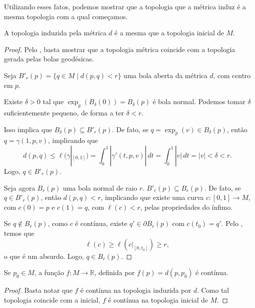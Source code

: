 Utilizando esses fatos, podemos mostrar que a topologia que a métrica induz é a mesma topologia com a qual começamos.
\begin{proposition}
    \label{prop:topologia-metrica-inicial}
    A topologia induzida pela métrica $d$ é a mesma que a topologia inicial de $M$.
    \begin{proof}

        Pelo , basta mostrar que a topologia métrica coincide com a topologia gerada pelas bolas geodésicas.

        Seja $B'_r(p) = \{q \in M \mid d(p,q) < r\}$ uma bola aberta da métrica $d$, com centro em $p$.

        Existe $\delta > 0$ tal que $\exp_p(B_\delta(0)) = B_\delta(p)$ é bola normal. Podemos tomar $\delta$ suficientemente pequeno, de forma a ter $\delta < r$.

        Isso implica que $B_\delta(p) \subseteq B'_r(p)$. De fato, se $q = \exp_p(v) \in B_\delta(p)$, então $q = \gamma(1,p,v)$, implicando que
        \begin{equation*}
            d(p,q) \leq \ell(\gamma|_{[0,1]}) = \int_0^1 |\gamma'(t,p,v)|\,dt = \int_0^1 |v|\,dt = |v| < \delta < r.
        \end{equation*}
        Logo, $q \in B'_r(p)$.

        Seja agora $B_r(p)$ uma bola normal de raio $r$. $B'_r(p) \subseteq B_r(p)$. De fato, se $q \in B'_r(p)$, então $d(p,q) < r$, implicando que existe uma curva $c: [0,1] \to M$, com $c(0) = p$ e $c(1) = q$, com $\ell(c) < r$, pelas propriedades do ínfimo.

        Se $q \notin B_r(p)$, como $c$ é contínua, existe $q' \in \partial B_r(p)$ com $c(t_{0})=q'$. Pelo , temos que
        \begin{equation*}
            \ell(c) \geq \ell(c|_{[0,t_0]}) \geq r,
        \end{equation*}
        o que é um absurdo. Logo, $q \in B_r(p)$.
    \end{proof}
\end{proposition}
\begin{corollary}
    \label{cor:distancia-continua}
    Se $p_0 \in M$, a função $f: M \to \mathbb{R}$, definida por $f(p) = d(p, p_0)$ é contínua.
    \begin{proof}

        Basta notar que $f$ é contínua na topologia induzida por $d$. Como tal topologia coincide com a inicial, $f$ é contínua na topologia inicial de $M$.
    \end{proof}
\end{corollary}
